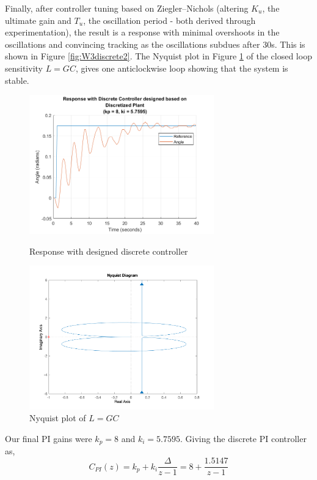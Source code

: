 \documentclass[11pt]{article}
\begin{document}
Finally, after controller tuning based on Ziegler–Nichols (altering $K_u$, the ultimate gain and $T_u$, the oscillation period - both derived through experimentation), the result is a response with minimal overshoots in the oscillations and convincing tracking as the oscillations subdues after 30s. This is shown in Figure \ref{fig:W3discrete2}. The Nyquist plot in Figure \ref{fig:Nyquist} of the closed loop sensitivity $L = GC$, gives one anticlockwise loop showing that the system is stable.

\begin{figure}[H]
    \begin{minipage}{.5\textwidth}
    \centering
    \includegraphics[width=8cm]{plots/Discrete_8_5_7595.png}
    \caption{Response with designed discrete controller}
    \label{fig:W3discrete2}
    \end{minipage}%
    \hspace{0.5cm}
    \begin{minipage}{.5\textwidth}
    \includegraphics[width=8cm]{W3_Nyquist.png}
    \caption{Nyquist plot of $L = GC$}
    \label{fig:Nyquist}
    \end{minipage}
\end{figure}

Our final PI gains were $k_{p} = 8$ and $k_i = 5.7595$. Giving the discrete PI controller as,
\begin{equation}\label{eq:DPI}
    C_{PI}(z) = k_p + k_i \frac{\Delta}{z - 1} = 8 + \frac{1.5147}{z -1}
\end{equation}
\end{document}
